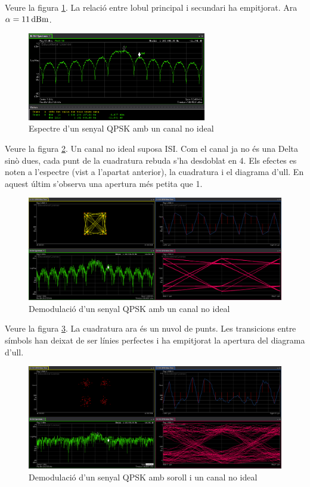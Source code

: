 \documentclass[catalan, a4paper, nobib]{tufte-handout}
\begin{document}

Veure la figura \ref{fig:3}. La relació entre lobul principal i secundari ha empitjorat. Ara $\alpha = \qty[qualifier-mode=combine]{11}{\deci\bel\of{m}}$.

\begin{figure}
    \begin{center}
        \includegraphics[width=295px]{3.png}
    \end{center}
    \caption{Espectre d'un senyal QPSK amb un canal no ideal}
    \label{fig:3}
\end{figure}


Veure la figura \ref{fig:4}. Un canal no ideal suposa ISI. Com el canal ja no és una Delta sinò dues, cada punt de la cuadratura rebuda s'ha desdoblat en \num{4}. Els efectes es noten a l'espectre (vist a l'apartat anterior), la cuadratura i el diagrama d'ull. En aquest últim s'observa una apertura més petita que \num{1}.

\begin{figure}
    \begin{center}
        \includegraphics[width=450px]{4.png}
    \end{center}
    \caption{Demodulació d'un senyal QPSK amb un canal no ideal}
    \label{fig:4}
\end{figure}

\newpage


Veure la figura \ref{fig:5}. La cuadratura ara és un nuvol de punts. Les transicions entre símbols han deixat de ser línies perfectes i ha empitjorat la apertura del diagrama d'ull.

\begin{figure}
    \begin{center}
        \includegraphics[width=450px]{5.png}
    \end{center}
    \caption{Demodulació d'un senyal QPSK amb soroll i un canal no ideal}
    \label{fig:5}
\end{figure}
\end{document}
